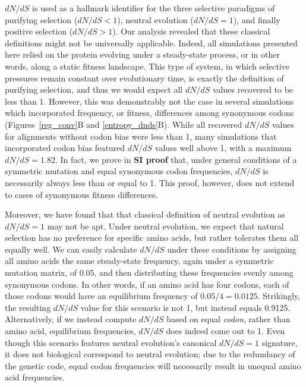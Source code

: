 \documentclass[11pt]{article}
\begin{document}
$dN/dS$ is used as a hallmark identifier for the three selective paradigms of purifying selection ($dN/dS < 1$), neutral evolution ($dN/dS = 1$), and finally positive selection ($dN/dS > 1$). Our analysis revealed that these classical definitions might not be universally applicable. Indeed, all simulations presented here relied on the protein evolving under a steady-state process, or in other words, along a static fitness landscape. This type of system, in which selective pressures remain constant over evolutionary time, is exactly the definition of purifying selection, and thus we would expect all $dN/dS$ values recovered to be less than 1. However, this was demonstrably not the case in several simulations which incorporated frequency, or fitness, differences among synonymous 
codons (Figures~\ref{reg_conv}B and \ref{entropy_dnds}B). While all recovered $dN/dS$ values for alignments without codon bias were less than 1, many simulations that incorporated codon bias featured $dN/dS$ values well above 1, with a maximum $dN/dS = 1.82$. In fact, we prove in \textbf{SI proof} that, under general conditions of a symmetric mutation and equal synonymous codon frequencies, $dN/dS$ is necessarily always less than or equal to 1. This proof, however, does not extend to cases of synonymous fitness differences. 

Moreover, we have found that that classical definition of neutral evolution as $dN/dS = 1$ may not be apt. Under neutral evolution, we expect that natural selection has no preference for specific amino acids, but rather tolerates them all equally well. We can easily calculate $dN/dS$ under these conditions by assigning all amino acids the same steady-state frequency, again under a symmetric mutation matrix, of 0.05, and then distributing these frequencies evenly among synonymous codons. In other words, if an amino acid has four codons, each of those codons would have an equilibrium frequency of $0.05/4 = 0.0125$. Strikingly, the resulting $dN/dS$ value for this scenario is not 1, but instead equals 0.9125. 
Alternatively, if we instead compute $dN/dS$ based on equal \textit{codon}, rather than amino acid, equilibrium frequencies, $dN/dS$ does indeed come out to 1. Even though this scenario features neutral evolution's canonical $dN/dS=1$ signature, it does not biological correspond to neutral evolution; due to the redundancy of the genetic code, equal codon frequencies will necessarily result in unequal amino acid frequencies.
\end{document}
